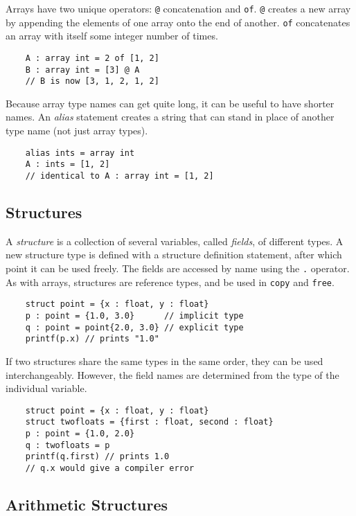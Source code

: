 \documentclass[main.tex]{subfiles}
\begin{document}
	Arrays have two unique operators: \texttt{@} concatenation and \texttt{of}. \texttt{@} creates a new array by appending the elements of one array onto the end of another. \texttt{of} concatenates an array with itself some integer number of times.
	
	\begin{lstlisting}
	A : array int = 2 of [1, 2]
	B : array int = [3] @ A
	// B is now [3, 1, 2, 1, 2] \end{lstlisting}
	
	Because array type names can get quite long, it can be useful to have shorter names. An \textit{alias} statement creates a string that can stand in place of another type name (not just array types).
	
	\begin{lstlisting}
	alias ints = array int
	A : ints = [1, 2] 
	// identical to A : array int = [1, 2]\end{lstlisting}
	
	\subsection{Structures}
	A \textit{structure} is a collection of several variables, called \textit{fields}, of different types. A new structure type is defined with a structure definition statement, after which point it can be used freely. The fields are accessed by name using the \texttt{.} operator. As with arrays, structures are reference types, and be used in \texttt{copy} and \texttt{free}. 
	
	\begin{lstlisting}
	struct point = {x : float, y : float}
	p : point = {1.0, 3.0}      // implicit type
	q : point = point{2.0, 3.0} // explicit type
	printf(p.x) // prints "1.0" \end{lstlisting}
	
	If two structures share the same types in the same order, they can be used interchangeably. However, the field names are determined from the type of the individual variable.
	
	\begin{lstlisting}
	struct point = {x : float, y : float}
	struct twofloats = {first : float, second : float}
	p : point = {1.0, 2.0}
	q : twofloats = p
	printf(q.first) // prints 1.0
	// q.x would give a compiler error \end{lstlisting}
	
	\subsection{Arithmetic Structures}
	
\end{document}
